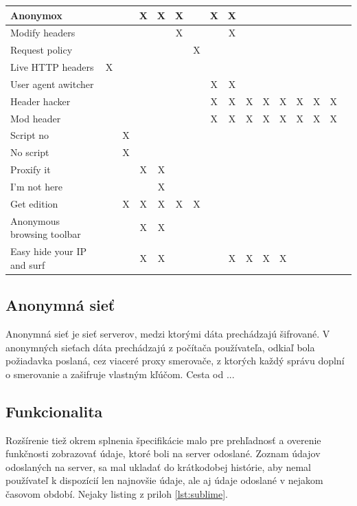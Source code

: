 \begin{table}[!htbp]
\begin{center}
\begin{tabular}{p{4cm}|c|c|c|c|c|c|c|c|c|c|c|c|c|c|c}
Anonymox &  && X & X & X &  & X & X & & & & & & \\  \hline
Modify headers & & &  &  & X &  &  & X &  &  &  & & &  \\  \hline
Request policy & & &  &  & & X  &  &  &  &  &  & & &   \\  \hline
Live HTTP headers & X& &  &  & &  &  &  &  &  &  & & &   \\  \hline
User agent awitcher & & &  &  & &  & X & X &  &  &  & & &   \\  \hline
Header hacker & & &  &  & &  & X & X & X & X & X & X & X & X    \\  \hline
Mod header & & &  &  & &  & X & X & X & X & X & X & X & X    \\  \hline
Script no & &X &  &  & &  &  &  &  &  &  &  &  &     \\  \hline
No script & &X &  &  & &  &  &  &  &  &  &  &  &     \\  \hline
Proxify it & & &X  & X & &  &  &  &  &  &  &  &  &     \\  \hline
I'm not here & & &  & X & &  &  &  &  &  &  &  &  &     \\  \hline
Get edition & &X &X &X &X&X &  &  &  &  &  &  &  &     \\  \hline
Anonymous browsing toolbar & & & X & X & &  &  &  &  &  &  &  &  &     \\  \hline
Easy hide your IP and surf & & & X & X& &  &  & X & X & X & X &  &  &     \\  \hline
\end{tabular}
\end{center}
\end{table}

\subsection{Anonymná sieť}
\noindent Anonymná sieť je sieť serverov, medzi ktorými dáta prechádzajú šifrované. V anonymných sieťach dáta prechádzajú z počítača používateľa, odkiaľ bola požiadavka poslaná, cez viaceré proxy smerovače, z ktorých každý správu doplní o smerovanie a zašifruje vlastným kľúčom. Cesta od ...


\subsection{Funkcionalita}
\noindent  Rozšírenie tiež okrem splnenia špecifikácie malo pre prehľadnosť a overenie funkčnosti zobrazovať údaje, ktoré boli na server odoslané. Zoznam údajov odoslaných na server, sa mal ukladať do krátkodobej histórie, aby nemal používateľ k dispozícií len najnovšie údaje, ale aj údaje odoslané v nejakom časovom období. Nejaky listing z priloh \ref{lst:sublime}.

